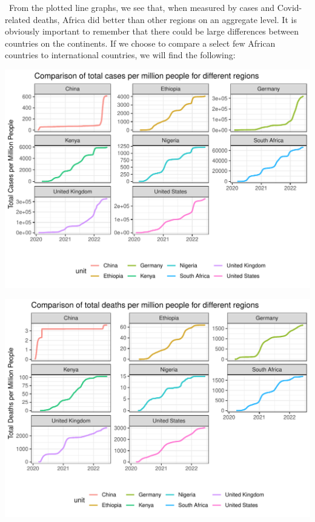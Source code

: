 \documentclass[11pt,preprint, authoryear]{elsarticle}
\let\origfigure\figure
\let\endorigfigure\endfigure
\renewenvironment{figure}[1][2] {
    \expandafter\origfigure\expandafter[H]
} {
    \endorigfigure
}
\numberwithin{equation}{section}
\numberwithin{figure}{section}
\numberwithin{table}{section}
\begin{document}
~From the plotted line graphs, we see that, when measured by cases and
Covid-related deaths, Africa did better than other regions on an
aggregate level. It is obviously important to remember that there could
be large differences between countries on the continents. If we choose
to compare a select few African countries to international countries, we
will find the following:

\begin{figure}[H]

{\centering \includegraphics{Question_1_files/figure-latex/Figure3-1} 

}

\caption{\label{Figure1}}\label{fig:Figure3}
\end{figure}
\begin{figure}[H]

{\centering \includegraphics{Question_1_files/figure-latex/Figure4-1} 

}

\caption{\label{Figure1}}\label{fig:Figure4}
\end{figure}
\end{document}
